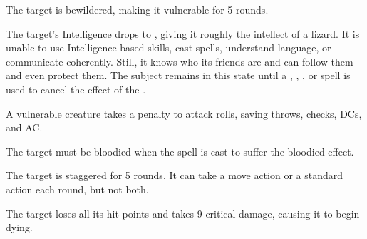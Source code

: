 \spellrng{\rngtouch}
\begin{spellhealthy}
  The target is bewildered, making it vulnerable for 5 rounds.
\end{spellhealthy}
\begin{spellblood}
  The target's Intelligence drops to , giving it roughly the intellect of a lizard. It is unable to use Intelligence-based skills, cast spells, understand language, or communicate coherently. Still, it knows who its friends are and can follow them and even protect them. The subject remains in this state until a , , , or  spell is used to cancel the effect of the .
\end{spellblood}
\begin{spellnotes}
  A vulnerable creature takes a  penalty to attack rolls, saving throws, checks, DCs, and AC.

  The target must be bloodied when the spell is cast to suffer the bloodied effect.
\end{spellnotes}

\spellrng{\rngclose}
\begin{spellhealthy}
  The target is staggered for 5 rounds. It can take a move action or a standard action each round, but not both.
\end{spellhealthy}
\begin{spellblood}
  The target loses all its hit points and takes 9 critical damage, causing it to begin dying.
\end{spellblood}

